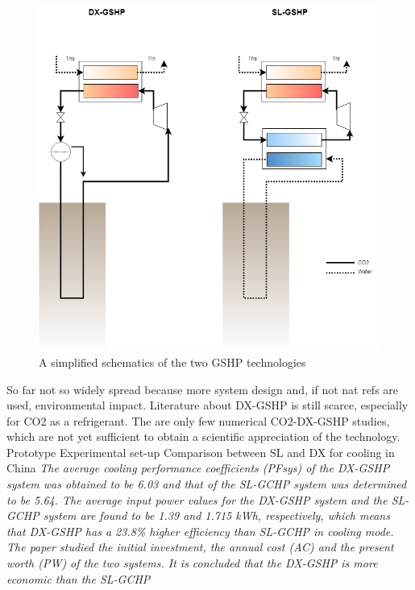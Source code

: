 \documentclass{article}
\begin{document}
\begin{figure}[h!]
\centering
\includegraphics[width=1\textwidth]{GSHP.png}
\caption{A simplified schematics of the two GSHP technologies}
\label{fig:gshp}
\end{figure}

So far not so widely spread because more system design and, if not nat refs are used, environmental impact.
Literature about DX-GSHP is still scarce, especially for CO2 as a refrigerant. The are only few numerical CO2-DX-GSHP studies, which are not yet sufficient to obtain a scientific appreciation of the technology. Prototype\cite{eslami-nejadDetailedTheoreticalCharacterization2018} Experimental set-up \cite{badacheExperimentalStudyCarbon2018}
Comparison between SL and DX for cooling in China \cite{guoTechnoeconomicComparisonDirect2012}
\textit{The average cooling performance coefficients (PFsys) of the DX-GSHP system was obtained to be 6.03 and that of the SL-GCHP system was determined to be 5.64. The average input power values for the DX-GSHP system and the SL-GCHP system are found to be 1.39 and 1.715 kWh, respectively,
which means that DX-GSHP has a 23.8\% higher efficiency than SL-GCHP in cooling mode. The paper
studied the initial investment, the annual cost (AC) and the present worth (PW) of the two systems. It is concluded that the DX-GSHP is more economic than the SL-GCHP}
\end{document}
